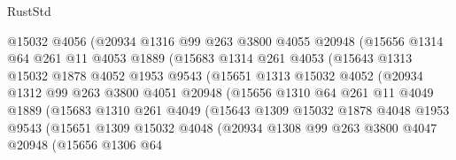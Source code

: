 \begin{lexlean}{RustStd}
\begin{coremodule}
                    @15032
                    @4056
                    (@20934
                      @1316
                      @99
                      @263
                      @3800
                      @4055
                      @20948
                      (@15656
                        @1314
                        @64
                        @261
                        @11
                        @4053
                        @1889
                        (@15683
                          @1314
                          @261
                          @4053
                          (@15643
                            @1313
                            @15032
                            @1878
                            @4052
                            @1953
                            @9543
                            (@15651
                              @1313
                              @15032
                              @4052
                              (@20934
                                @1312
                                @99
                                @263
                                @3800
                                @4051
                                @20948
                                (@15656
                                  @1310
                                  @64
                                  @261
                                  @11
                                  @4049
                                  @1889
                                  (@15683
                                    @1310
                                    @261
                                    @4049
                                    (@15643
                                      @1309
                                      @15032
                                      @1878
                                      @4048
                                      @1953
                                      @9543
                                      (@15651
                                        @1309
                                        @15032
                                        @4048
                                        (@20934
                                          @1308
                                          @99
                                          @263
                                          @3800
                                          @4047
                                          @20948
                                          (@15656
                                            @1306
                                            @64

\end{coremodule}
\end{lexlean}
